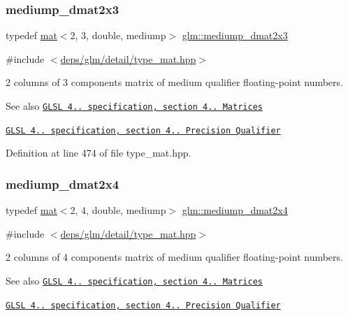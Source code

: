 \subsubsection{\texorpdfstring{mediump\+\_\+dmat2x3}{mediump\_dmat2x3}}
{\footnotesize\ttfamily typedef \hyperlink{structglm_1_1mat}{mat}$<$2, 3, double, mediump$>$ \hyperlink{group__core__precision_gaf3a6e61247ffcbbf9211186d0d250a2b}{glm\+::mediump\+\_\+dmat2x3}}



{\ttfamily \#include $<$\hyperlink{type__mat_8hpp}{deps/glm/detail/type\+\_\+mat.\+hpp}$>$}

2 columns of 3 components matrix of medium qualifier floating-\/point numbers.

\begin{DoxySeeAlso}{See also}
\href{http://www.opengl.org/registry/doc/GLSLangSpec.4.20.8.pdf}{\tt G\+L\+SL 4.. specification, section 4.. Matrices} 

\href{http://www.opengl.org/registry/doc/GLSLangSpec.4.20.8.pdf}{\tt G\+L\+SL 4.. specification, section 4.. Precision Qualifier} 
\end{DoxySeeAlso}


Definition at line 474 of file type\+\_\+mat.\+hpp.

\mbox{\label{group__core__precision_ga20d1a647a3ef0083e306d026c77ac906}} 
\subsubsection{\texorpdfstring{mediump\+\_\+dmat2x4}{mediump\_dmat2x4}}
{\footnotesize\ttfamily typedef \hyperlink{structglm_1_1mat}{mat}$<$2, 4, double, mediump$>$ \hyperlink{group__core__precision_ga20d1a647a3ef0083e306d026c77ac906}{glm\+::mediump\+\_\+dmat2x4}}



{\ttfamily \#include $<$\hyperlink{type__mat_8hpp}{deps/glm/detail/type\+\_\+mat.\+hpp}$>$}

2 columns of 4 components matrix of medium qualifier floating-\/point numbers.

\begin{DoxySeeAlso}{See also}
\href{http://www.opengl.org/registry/doc/GLSLangSpec.4.20.8.pdf}{\tt G\+L\+SL 4.. specification, section 4.. Matrices} 

\href{http://www.opengl.org/registry/doc/GLSLangSpec.4.20.8.pdf}{\tt G\+L\+SL 4.. specification, section 4.. Precision Qualifier} 
\end{DoxySeeAlso}


